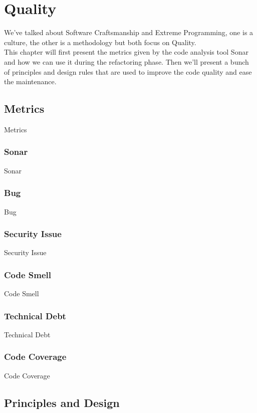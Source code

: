 \section{Quality}\label{sec:quality}
We've talked about Software Craftsmanship and Extreme Programming,
one is a culture, the other is a methodology but both focus on Quality. \\
This chapter will first present the metrics given by the code analysis
tool Sonar and how we can use it during the refactoring phase.
Then we'll present a bunch of principles and design rules that
are used to improve the code quality and ease the maintenance.

\subsection{Metrics}\label{subsec:metrics}
Metrics

\subsubsection{Sonar}
Sonar

\subsubsection{Bug}
Bug

\subsubsection{Security Issue}
Security Issue

\subsubsection{Code Smell}
Code Smell

\subsubsection{Technical Debt}
Technical Debt

\subsubsection{Code Coverage}
Code Coverage

\subsection{Principles and Design}\label{subsec:principles}

